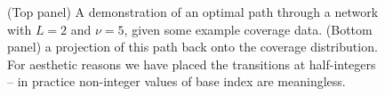 \documentclass[fleqn,usenatbib]{acmart}
\begin{document}
\begin{figure}
\begin{center}
{
						}
						\caption{(Top panel) A demonstration of an optimal path through a network with $L=2$ and $\nu=5$, given some example coverage data. (Bottom panel) a projection of this path back onto the coverage distribution. For aesthetic reasons we have placed the transitions at half-integers -- in practice non-integer values of base index are meaningless.}\label{F:Path}
					\end{center}
				\end{figure}
\end{document}
